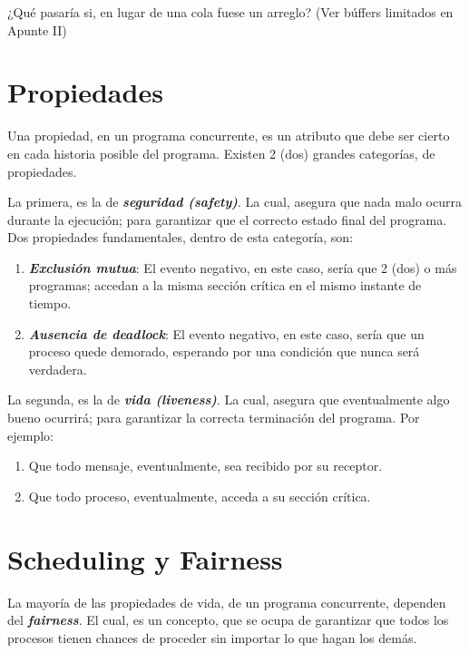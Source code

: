 \documentclass[a4paper, 10pt]{report}
\begin{document}
\begin{basic_box}
     ¿Qué pasaría si, en lugar de una cola fuese un arreglo? (Ver búffers limitados en Apunte II)
\end{basic_box}

\section{Propiedades}

Una propiedad, en un programa concurrente, es un atributo que debe ser cierto en cada historia posible del programa. Existen 2 (dos) grandes categorías, de propiedades.

La primera, es la de \textbf{\emph{seguridad (safety)}}. La cual, asegura que nada malo ocurra durante la ejecución; para garantizar que el correcto estado final del programa. Dos propiedades fundamentales, dentro de esta categoría, son:

\begin{enumerate}
    \item \textbf{\emph{Exclusión mutua}}: El evento negativo, en este caso, sería que 2 (dos) o más programas; accedan a la misma sección crítica en el mismo instante de tiempo.
    \item \textbf{\emph{Ausencia de deadlock}}: El evento negativo, en este caso, sería que un proceso quede demorado, esperando por una condición que nunca será verdadera. 
\end{enumerate}

La segunda, es la de \textbf{\emph{vida (liveness)}}. La cual, asegura que eventualmente algo bueno ocurrirá; para garantizar la correcta terminación del programa. Por ejemplo:

\begin{enumerate}
    \item Que todo mensaje, eventualmente, sea recibido por su receptor.
    \item Que todo proceso, eventualmente, acceda a su sección crítica.
\end{enumerate}

\section{Scheduling y Fairness}

La mayoría de las propiedades de vida, de un programa concurrente, dependen del \textbf{\emph{fairness}}. El cual, es un concepto, que se ocupa de garantizar que todos los procesos tienen chances de proceder sin importar lo que hagan los demás.
\end{document}
